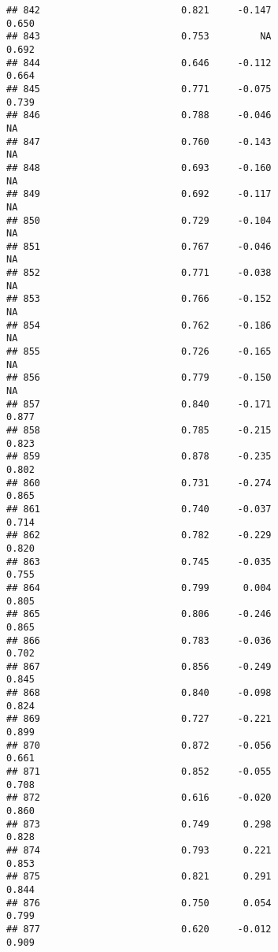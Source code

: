 \documentclass[
]{article}
\begin{document}
\begin{verbatim}
## 842                         0.821     -0.147                     0.650
## 843                         0.753         NA                     0.692
## 844                         0.646     -0.112                     0.664
## 845                         0.771     -0.075                     0.739
## 846                         0.788     -0.046                        NA
## 847                         0.760     -0.143                        NA
## 848                         0.693     -0.160                        NA
## 849                         0.692     -0.117                        NA
## 850                         0.729     -0.104                        NA
## 851                         0.767     -0.046                        NA
## 852                         0.771     -0.038                        NA
## 853                         0.766     -0.152                        NA
## 854                         0.762     -0.186                        NA
## 855                         0.726     -0.165                        NA
## 856                         0.779     -0.150                        NA
## 857                         0.840     -0.171                     0.877
## 858                         0.785     -0.215                     0.823
## 859                         0.878     -0.235                     0.802
## 860                         0.731     -0.274                     0.865
## 861                         0.740     -0.037                     0.714
## 862                         0.782     -0.229                     0.820
## 863                         0.745     -0.035                     0.755
## 864                         0.799      0.004                     0.805
## 865                         0.806     -0.246                     0.865
## 866                         0.783     -0.036                     0.702
## 867                         0.856     -0.249                     0.845
## 868                         0.840     -0.098                     0.824
## 869                         0.727     -0.221                     0.899
## 870                         0.872     -0.056                     0.661
## 871                         0.852     -0.055                     0.708
## 872                         0.616     -0.020                     0.860
## 873                         0.749      0.298                     0.828
## 874                         0.793      0.221                     0.853
## 875                         0.821      0.291                     0.844
## 876                         0.750      0.054                     0.799
## 877                         0.620     -0.012                     0.909

\end{verbatim}
\end{document}
